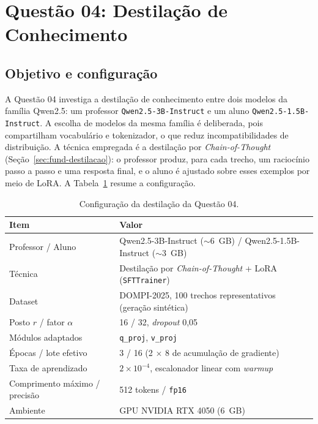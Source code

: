 \section{Questão 04: Destilação de Conhecimento}
\label{sec:q4}

\subsection{Objetivo e configuração}

A Questão 04 investiga a destilação de conhecimento entre dois modelos da família
Qwen2.5: um professor \texttt{Qwen2.5-3B-Instruct} e um aluno
\texttt{Qwen2.5-1.5B-Instruct}. A escolha de modelos da mesma família é deliberada,
pois compartilham vocabulário e tokenizador, o que reduz incompatibilidades de
distribuição. A técnica empregada é a destilação por \textit{Chain-of-Thought}
(Seção~\ref{sec:fund-destilacao}): o professor produz, para cada trecho, um
raciocínio passo a passo e uma resposta final, e o aluno é ajustado sobre esses
exemplos por meio de LoRA. A Tabela~\ref{tab:q4-config} resume a configuração.

\begin{table}[ht]
  \centering
  \caption{Configuração da destilação da Questão 04.}
  \label{tab:q4-config}
  \footnotesize
  \begin{tabularx}{0.92\textwidth}{@{}l X@{}}
    \toprule
    \textbf{Item} & \textbf{Valor} \\
    \midrule
    Professor / Aluno & Qwen2.5-3B-Instruct ($\sim$6~GB) / Qwen2.5-1.5B-Instruct ($\sim$3~GB) \\
    Técnica & Destilação por \textit{Chain-of-Thought} + LoRA (\texttt{SFTTrainer}) \\
    Dataset & DOMPI-2025, 100 trechos representativos (geração sintética) \\
    Posto $r$ / fator $\alpha$ & 16 / 32, \textit{dropout} 0,05 \\
    Módulos adaptados & \texttt{q\_proj}, \texttt{v\_proj} \\
    Épocas / lote efetivo & 3 / 16 (2 $\times$ 8 de acumulação de gradiente) \\
    Taxa de aprendizado & $2 \times 10^{-4}$, escalonador linear com \textit{warmup} \\
    Comprimento máximo / precisão & 512 tokens / \texttt{fp16} \\
    Ambiente & GPU NVIDIA RTX 4050 (6~GB) \\
    \bottomrule
  \end{tabularx}
\end{table}

